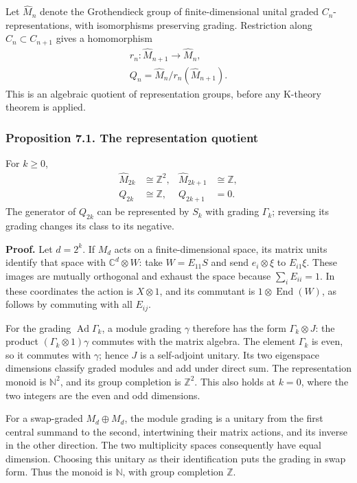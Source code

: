 \documentclass[
  11pt,
]{article}
\begin{document}
Let \(\widehat M_n\) denote the Grothendieck group of finite-dimensional
unital graded \(C_n\)-representations, with isomorphisms preserving
grading. Restriction along \(C_n\subset C_{n+1}\) gives a homomorphism
\[
\begin{gathered}
r_n:\widehat M_{n+1}\to\widehat M_n,\\
Q_n=\widehat M_n/r_n(\widehat M_{n+1}).
\end{gathered}
\tag{7.1}
\] This is an algebraic quotient of representation groups, before any
K-theory theorem is applied.

\subsubsection{Proposition 7.1. The representation
quotient}\label{proposition-7.1.-the-representation-quotient}

For \(k\geq0\), \[
\begin{aligned}
\widehat M_{2k}&\cong\mathbb Z^2,&
\widehat M_{2k+1}&\cong\mathbb Z,\\
Q_{2k}&\cong\mathbb Z,& Q_{2k+1}&=0.
\end{aligned}
\tag{7.2}
\] The generator of \(Q_{2k}\) can be represented by \(S_k\) with
grading \(\Gamma_k\); reversing its grading changes its class to its
negative.

\textbf{Proof.} Let \(d=2^k\). If \(M_d\) acts on a finite-dimensional
space, its matrix units identify that space with
\(\mathbb C^d\otimes W\): take \(W=E_{11}S\) and send \(e_i\otimes\xi\)
to \(E_{i1}\xi\). These images are mutually orthogonal and exhaust the
space because \(\sum_iE_{ii}=1\). In these coordinates the action is
\(X\otimes1\), and its commutant is \(1\otimes\operatorname{End}(W)\),
as follows by commuting with all \(E_{ij}\).

For the grading \(\operatorname{Ad}\Gamma_k\), a module grading
\(\gamma\) therefore has the form \(\Gamma_k\otimes J\): the product
\((\Gamma_k\otimes1)\gamma\) commutes with the matrix algebra. The
element \(\Gamma_k\) is even, so it commutes with \(\gamma\); hence
\(J\) is a self-adjoint unitary. Its two eigenspace dimensions classify
graded modules and add under direct sum. The representation monoid is
\(\mathbb N^2\), and its group completion is \(\mathbb Z^2\). This also
holds at \(k=0\), where the two integers are the even and odd
dimensions.

For a swap-graded \(M_d\oplus M_d\), the module grading is a unitary
from the first central summand to the second, intertwining their matrix
actions, and its inverse in the other direction. The two multiplicity
spaces consequently have equal dimension. Choosing this unitary as their
identification puts the grading in swap form. Thus the monoid is
\(\mathbb N\), with group completion \(\mathbb Z\).
\end{document}
